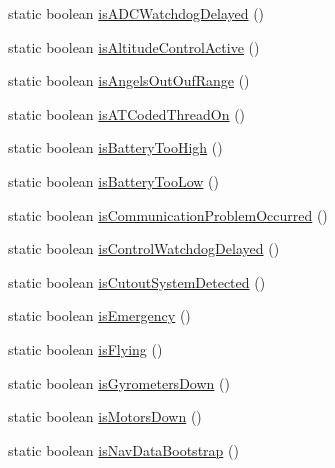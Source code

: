 \begin{DoxyCompactItemize}
\item 
static boolean \hyperlink{classworkspace_1_1_a_r_drone_nav_data_1_1src_1_1_nav_data_ac1d934c736b27e9cc93d298116c9e2fe}{is\+A\+D\+C\+Watchdog\+Delayed} ()
\item 
static boolean \hyperlink{classworkspace_1_1_a_r_drone_nav_data_1_1src_1_1_nav_data_a1f87312594bb29b3db13a50e932b3aa5}{is\+Altitude\+Control\+Active} ()
\item 
static boolean \hyperlink{classworkspace_1_1_a_r_drone_nav_data_1_1src_1_1_nav_data_a1c824ad7d0022177165cb2edb43c7b9b}{is\+Angels\+Out\+Ouf\+Range} ()
\item 
static boolean \hyperlink{classworkspace_1_1_a_r_drone_nav_data_1_1src_1_1_nav_data_a69af7d2d3857397fa4442b2c85cda44b}{is\+A\+T\+Coded\+Thread\+On} ()
\item 
static boolean \hyperlink{classworkspace_1_1_a_r_drone_nav_data_1_1src_1_1_nav_data_af80d29a20035418c8a93c3fb8359c933}{is\+Battery\+Too\+High} ()
\item 
static boolean \hyperlink{classworkspace_1_1_a_r_drone_nav_data_1_1src_1_1_nav_data_a2882c88021ea343fe8bfabed99899362}{is\+Battery\+Too\+Low} ()
\item 
static boolean \hyperlink{classworkspace_1_1_a_r_drone_nav_data_1_1src_1_1_nav_data_a9651d9adafe52a0b34130c1bac15a6a1}{is\+Communication\+Problem\+Occurred} ()
\item 
static boolean \hyperlink{classworkspace_1_1_a_r_drone_nav_data_1_1src_1_1_nav_data_a47cdaba22ef6707f2191ea14a915ea5a}{is\+Control\+Watchdog\+Delayed} ()
\item 
static boolean \hyperlink{classworkspace_1_1_a_r_drone_nav_data_1_1src_1_1_nav_data_a6b0d1159ea5ea1ce0fee1f7ce0ef38af}{is\+Cutout\+System\+Detected} ()
\item 
static boolean \hyperlink{classworkspace_1_1_a_r_drone_nav_data_1_1src_1_1_nav_data_a8b957f8e7904226029564438ec40f9eb}{is\+Emergency} ()
\item 
static boolean \hyperlink{classworkspace_1_1_a_r_drone_nav_data_1_1src_1_1_nav_data_a2324d628601dd71480c96339c2d6b458}{is\+Flying} ()
\item 
static boolean \hyperlink{classworkspace_1_1_a_r_drone_nav_data_1_1src_1_1_nav_data_aa7625a59a46373cb7ddb407bd64bad76}{is\+Gyrometers\+Down} ()
\item 
static boolean \hyperlink{classworkspace_1_1_a_r_drone_nav_data_1_1src_1_1_nav_data_a88502452c497c6b8ba93f31fdf5e4330}{is\+Motors\+Down} ()
\item 
static boolean \hyperlink{classworkspace_1_1_a_r_drone_nav_data_1_1src_1_1_nav_data_a060e4b2c6a8312be16c391c550894f7a}{is\+Nav\+Data\+Bootstrap} ()

\end{DoxyCompactItemize}
